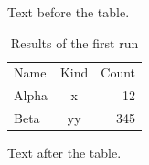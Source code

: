 \documentclass{article}
\begin{document}
Text before the table.

\begin{table}[h]\centering\caption{Results of the first run}\begin{tabular}{lcr}Name & Kind & Count\\Alpha & x & 12\\Beta & yy & 345\end{tabular}\end{table}

Text after the table.
\end{document}
